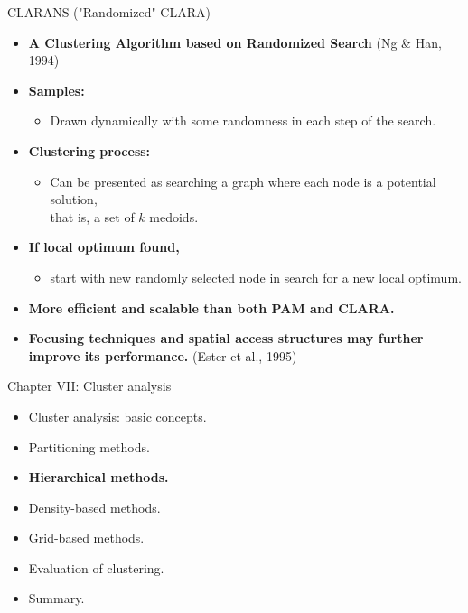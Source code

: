 \documentclass[aspectratio=169,t,xcolor=dvipsnames]{beamer}
\begin{document}
  { %
    \begin{frame}{CLARANS ("Randomized" CLARA)}
      \begin{itemize}
        \item \textbf{A Clustering Algorithm based on Randomized Search} (Ng \& Han, 1994)
        \item \textbf{Samples:}
        \begin{itemize}
          \item Drawn dynamically with some randomness in each step of the search.
        \end{itemize}
        \item \textbf{Clustering process:}
        \begin{itemize}
          \item Can be presented as searching a graph where each node is a potential solution,\\
          that is, a set of $k$ medoids.
        \end{itemize}
        \item \textbf{If local optimum found,}
        \begin{itemize}
          \item start with new randomly selected node in search for a new local optimum.
        \end{itemize}
        \item \textbf{More efficient and scalable than both PAM and CLARA.}
        \item \textbf{Focusing techniques and spatial access structures may further improve its performance.} (Ester et al., 1995)
      \end{itemize}
    \end{frame}
  }

  {
    \begin{frame}{Chapter VII: Cluster analysis}
        \begin{itemize}
            \item Cluster analysis: basic concepts.
            \item Partitioning methods.
            \item \textbf{Hierarchical methods.}
            \item Density-based methods.
            \item Grid-based methods.
            \item Evaluation of clustering.
            \item Summary.
        \end{itemize}
    \end{frame}
  }
\end{document}
